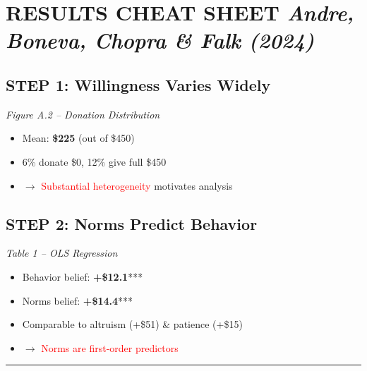 \documentclass[10pt,a4paper]{article}
\begin{document}
\pagestyle{empty}
\setlength{\parindent}{0pt}
\setlength{\parskip}{3pt}

\section*{\Large\textbf{RESULTS CHEAT SHEET} \hfill \textit{Andre, Boneva, Chopra \& Falk (2024)}}

\begin{minipage}[t]{0.48\textwidth}
\subsection*{STEP 1: Willingness Varies Widely}
\textit{Figure A.2 -- Donation Distribution}
\begin{itemize}[nosep]
    \item Mean: \textbf{\$225} (out of \$450)
    \item 6\% donate \$0, 12\% give full \$450
    \item $\rightarrow$ \textcolor{red}{Substantial heterogeneity} motivates analysis
\end{itemize}
\end{minipage}
\hfill
\begin{minipage}[t]{0.48\textwidth}
\subsection*{STEP 2: Norms Predict Behavior}
\textit{Table 1 -- OLS Regression}
\begin{itemize}[nosep]
    \item Behavior belief: \textbf{+\$12.1}*** 
    \item Norms belief: \textbf{+\$14.4}***
    \item Comparable to altruism (+\$51) \& patience (+\$15)
    \item $\rightarrow$ \textcolor{red}{Norms are first-order predictors}
\end{itemize}
\end{minipage}

\vspace{8pt}
\hrule
\vspace{8pt}
\end{document}
